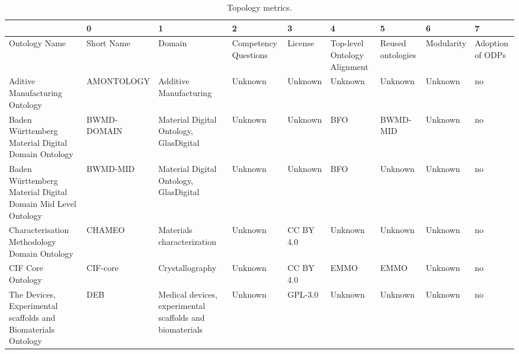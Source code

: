 \begin{table}
\centering
\caption{Topology metrics.}
\label{tab:topology-metrics}
\begin{tabular}{m{5cm}m{2cm}m{5cm}m{2cm}m{2cm}m{2cm}m{2cm}m{2cm}m{2cm}}
\toprule
{} &                  0  &                    1  &                     2&3&4&5&6&7 \\
\midrule                                                                    Ontology Name &              Short Name &                                                                            Domain & Competency Questions &      License & Top-level Ontology Alignment & Reused ontologies & Modularity & Adoption of ODPs \\
                                                   Aditive Manufacturing Ontology &              AMONTOLOGY &                                                            Additive Manufacturing &              Unknown &      Unknown &                      Unknown &           Unknown &    Unknown &               no \\
            Baden Württemberg Material Digital Domain Ontology &             BWMD-DOMAIN &                                            Material Digital Ontology, GlasDigital &              Unknown &      Unknown &                          BFO &          BWMD-MID &    Unknown &               no \\
  Baden Württemberg Material Digital Domain Mid Level Ontology &                BWMD-MID &                                            Material Digital Ontology, GlasDigital &              Unknown &      Unknown &                          BFO &           Unknown &    Unknown &               no \\
                       Characterisation Methodology Domain Ontology &                  CHAMEO &                                                        Materials characterization &              Unknown &    CC BY 4.0 &                      Unknown &           Unknown &    Unknown &               no \\
                                                                CIF Core Ontology &                CIF-core &                                                                   Crystallography &              Unknown &    CC BY 4.0 &                         EMMO &              EMMO &    Unknown &               no \\
The Devices, Experimental scaffolds and Biomaterials Ontology &                     DEB &                          Medical devices, experimental scaffolds and biomaterials &              Unknown &    GPL-3.0   &                      Unknown &           Unknown &    Unknown &               no \\

\end{tabular}
\end{table}
